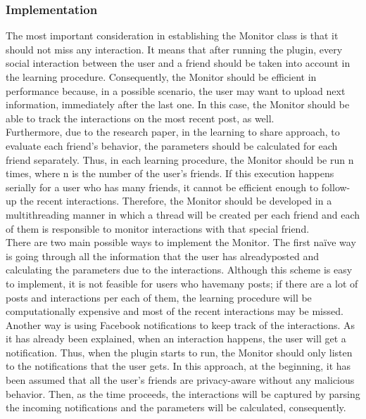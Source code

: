 \documentclass[a4paper,11pt]{article}
\begin{document}
\subsubsection{Implementation}

The most important consideration in establishing the Monitor class is that it should not miss any interaction. It means that after running the plugin, every social interaction between the user and a friend should be taken into account in the learning procedure. Consequently, the Monitor should be efficient in performance because, in a possible scenario, the user may want to upload next information, immediately after the last one. In this case, the Monitor should be able to track the interactions on the most recent post, as well.
\\
Furthermore, due to the research paper, in the learning to share approach, to evaluate each friend’s behavior, the parameters should be calculated for each friend separately. Thus, in each learning procedure, the Monitor should be run n times, where n is the number of the user’s friends. If this execution happens serially for a user who has many friends, it cannot be efficient enough to follow-up the recent interactions. Therefore, the Monitor should be developed in a multithreading manner in which a thread will be created per each friend and each of them is responsible to monitor interactions with that special friend.
\\
There are two main possible ways to implement the Monitor. The first naïve way is going through all the information that the user has alreadyposted and calculating the parameters due to the interactions. Although this scheme is easy to implement, it is not feasible for users who havemany posts; if there are a lot of posts and interactions per each of them, the learning procedure will be computationally expensive and most of the recent interactions may be missed.
\\
Another way is using Facebook notifications to keep track of the interactions. As it has already been explained, when an interaction happens, the user will get a notification. Thus, when the plugin starts to run, the Monitor should only listen to the notifications that the user gets. In this approach, at the beginning, it has been assumed that all the user’s friends are privacy-aware without any malicious behavior. Then, as the time proceeds, the interactions will be captured by parsing the incoming notifications and the parameters will be calculated, consequently. 
\end{document}
